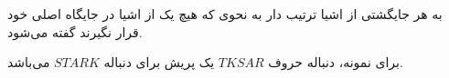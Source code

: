
\begin{definition}
    \p
    به هر جایگشتی از اشیا ترتیب دار به نحوی که هیچ یک از اشیا در
    جایگاه اصلی خود قرار نگیرند 
    گفته می‌شود.
\end{definition}

\p
برای نمونه،
دنباله حروف
$TKSAR$
یک پریش برای دنباله
$STARK$
می‌باشد.


